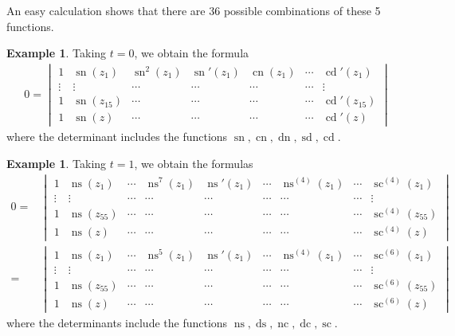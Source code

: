 \documentclass{amsart}
\theoremstyle{definition}
\newtheorem{example}[theorem]{Example}
\DeclareMathOperator{\ns}{ns}
\DeclareMathOperator{\nc}{nc}
\DeclareMathOperator{\dn}{dn}
\DeclareMathOperator{\ds}{ds}
\DeclareMathOperator{\sn}{sn}
\DeclareMathOperator{\cn}{cn}
\DeclareMathOperator{\scJ}{sc}
\DeclareMathOperator{\cd}{cd}
\DeclareMathOperator{\dc}{dc}
\DeclareMathOperator{\sd}{sd}
\begin{document}
An easy calculation shows that there are $36$ possible combinations of these 5 functions.
\begin{example}
    Taking $t=0$, we obtain the formula
    \begin{align*}
        0=\begin{vmatrix}
1 & \sn(z_1) & \sn^2(z_1) & \sn'(z_1) & \cn(z_1) & \cdots & \cd '(z_1) \\ 
\vdots & \vdots  & \cdots & \cdots & \cdots & \cdots & \vdots \\
1 & \sn(z_{15})  & \cdots & \cdots & \cdots & \cdots & \cd '(z_{15}) \\
1 & \sn(z) &  \cdots & \cdots & \cdots & \cdots & \cd '(z)
\end{vmatrix}
    \end{align*}
    where the determinant includes the functions $\sn,\cn,\dn,\sd,\cd$.
\end{example}
\begin{example}
    Taking $t=1$, we obtain the formulas
    \begin{align*}
        0=&\begin{vmatrix}
1&\ns(z_1) & \cdots & \ns^{7}(z_1) & \ns'(z_1) & \cdots & \ns^{(4)}(z_1) & \cdots &  \scJ^{(4)}(z_1) \\
 \vdots&\vdots & \cdots & \cdots &  \cdots & \cdots & \cdots & \cdots & \vdots \\
 1& \ns(z_{55})&\cdots  & \cdots & \cdots & \cdots & \cdots & \cdots   & \scJ^{(4)}(z_{55})\\
1& \ns(z)&\cdots &\cdots &\cdots &\cdots &\cdots &\cdots & \scJ^{(4)}(z)
\end{vmatrix}\\
=&\begin{vmatrix}
1&\ns(z_1) & \cdots & \ns^{5}(z_1) & \ns'(z_1) & \cdots & \ns^{(4)}(z_1) & \cdots &  \scJ^{(6)}(z_1) \\
 \vdots&\vdots & \cdots & \cdots &  \cdots & \cdots & \cdots & \cdots & \vdots \\
 1& \ns(z_{55})&\cdots  & \cdots & \cdots & \cdots & \cdots & \cdots   & \scJ^{(6)}(z_{55})\\
1& \ns(z)&\cdots &\cdots &\cdots &\cdots &\cdots &\cdots & \scJ^{(6)}(z)
\end{vmatrix}
    \end{align*}
    where the determinants include the functions $\ns,\ds,\nc,\dc,\scJ$.
\end{example}
\end{document}
